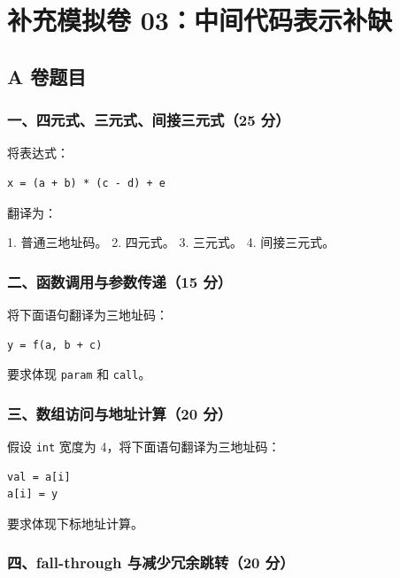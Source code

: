 \documentclass[UTF8]{ctexart}
\begin{document}
\section*{补充模拟卷 03：中间代码表示补缺}

\subsection*{A 卷题目}

\subsubsection*{一、四元式、三元式、间接三元式（25 分）}

将表达式：

\begin{Verbatim}[fontsize=\small,breaklines=true]
x = (a + b) * (c - d) + e
\end{Verbatim}

翻译为：

1. 普通三地址码。 2. 四元式。 3. 三元式。 4. 间接三元式。

\subsubsection*{二、函数调用与参数传递（15 分）}

将下面语句翻译为三地址码：

\begin{Verbatim}[fontsize=\small,breaklines=true]
y = f(a, b + c)
\end{Verbatim}

要求体现 \texttt{param} 和 \texttt{call}。

\subsubsection*{三、数组访问与地址计算（20 分）}

假设 \texttt{int} 宽度为 4，将下面语句翻译为三地址码：

\begin{Verbatim}[fontsize=\small,breaklines=true]
val = a[i]
a[i] = y
\end{Verbatim}

要求体现下标地址计算。

\subsubsection*{四、fall-through 与减少冗余跳转（20 分）}
\end{document}
